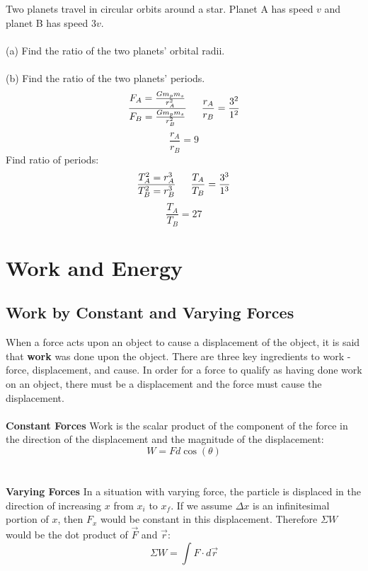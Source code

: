 \documentclass{article}
\begin{document}
        \begin{multicols}{2}
        	
			Two planets travel in circular orbits around a star.  Planet A has speed $v$ and planet B has speed $3v$.\\\\ (a) Find the ratio of the two planets’ orbital radii.\\\\ (b) Find the ratio of the two planets’ periods.
			\vfill
			\columnbreak
			\[
				\frac
                {F_A=\frac{Gm_pm_s}{r_A^2}}
                {F_B=\frac{Gm_pm_s}{r_B^2}}
                \indent
                \frac{r_A}{r_B}=\frac
                {3^2}
                {1^2}
			\]
			\[
             	\frac{r_A}{r_B}=9
			\]
			Find ratio of periods:
			\[
             	\frac
                {T_A^2=r_A^3}
                {T_B^2=r_B^3}
                \indent
                \frac
                {T_A}
				{T_B} = \frac{3^3}{1^3}
			\]
			\[
             	\frac{T_A}{T_B}=27
			\]
		\end{multicols}
        
\section{Work and Energy}
	\subsection{Work by Constant and Varying Forces}
		When a force acts upon an object to cause a displacement of the object, it is said that \textbf{work} was done upon the object. There are three key ingredients to work - force, displacement, and cause. In order for a force to qualify as having done work on an object, there must be a displacement and the force must cause the displacement.
        \\\\
        \textbf{Constant Forces} Work is the scalar product of the component of the force in the direction of the displacement and the magnitude of the displacement:
        \[
        	W=Fd\cos(\theta)
        \]
        \\\\
        \textbf{Varying Forces} In a situation with varying force, the particle is displaced in the direction of increasing $x$ from $x_i$ to $x_f$. If we assume $\Delta x$ is an infinitesimal portion of $x$, then $F_x$ would be constant in this displacement. Therefore $\Sigma W$ would be the dot product of $\vec{F}$ and $\vec{r}$:
        \[
        	\Sigma W=\int F\cdot d\vec{r}
        \]
\end{document}

